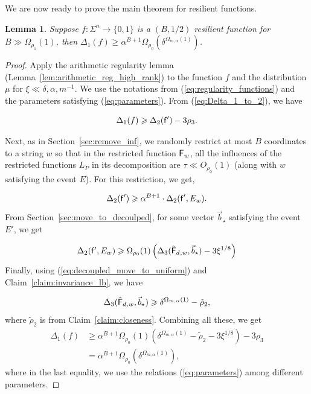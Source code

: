 \documentclass[10pt,a4paper]{amsart}
\newtheorem{lemma}[thm]{Lemma}
\renewcommand\geq{\geqslant}
\newcommand{\V}[1]{{#1}}
\begin{document}
We are now ready to prove the main theorem for resilient functions.
\begin{lemma}\label{lemma:mainthm_resilient_f}
    Suppose $f:\Sigma^n \rightarrow \{0,1\}$ is a $(B, 1/2)$ resilient function for $B \gg \Omega_{\rho_1}(1)$, then $\Delta_1(f)\geq  \alpha^{B+1} \Omega_{\rho_0}(\delta^{\Omega_{m,\alpha}(1)})$.
\end{lemma}
\begin{proof}
    Apply the arithmetic regularity lemma (Lemma~\ref{lem:arithmetic_reg_high_rank}) to the function $f$ and the distribution $\mu$ for $\xi\ll \delta,\alpha, m^{-1}$. We use the notations from (\ref{eq:regularity_functions}) and the parameters satisfying (\ref{eq:parameters}). From (\ref{eq:Delta_1_to_2}), we have
    
    $$\Delta_1(f) \geq \Delta_2(\noisyfrefined)  - 3\rho_3.$$

    Next, as in Section~\ref{sec:remove_inf}, we randomly restrict at most $B$ coordinates to a string $\V w$ so that in the restricted function $\fcoarsedecomposed_{\V w}$, all the influences of the restricted functions $L_P$ in its decomposition are $\tau  \ll O_{\rho_0}(1)$ (along with $\V w$ satisfying the event $E$). For this restriction, we get,
    
    $$\Delta_2(\noisyfrefined) \geq \alpha^{B+1}\cdot \Delta_2(\noisyfrefined, E_{\V w}).$$
   From Section~\ref{sec:move_to_decoulped}, for some vector $\vec{b}_\star$ satisfying the event $E'$, we get

    $$ \Delta_2(\noisyfrefined, E_{\V w}) \geq \Omega_{\rho_0}(1)\left(\Delta_3(\truncfcoarsedecoupled_{, \V w}, \vec{b}_\star) - 3\xi^{1/8}\right)$$
    Finally, using (\ref{eq:decoupled_move_to_uniform}) and Claim~\ref{claim:invariance_lb}, we have

$$\Delta_3(\truncfcoarsedecoupled_{, \V w}, \vec{b}_\star)\geq \delta^{\Omega_{m,\alpha}(1)} -\tilde{\rho}_2,$$
where $\tilde{\rho}_2$ is from Claim~\ref{claim:closeness}. Combining all these, we get
\begin{align*}
\Delta_1(f) &\geq  \alpha^{B+1} \Omega_{\rho_0}(1)\left( \delta^{\Omega_{m,\alpha}(1)} -\tilde{\rho}_2 - 3\xi^{1/8}\right) - 3\rho_3\\
& = \alpha^{B+1} \Omega_{\rho_0}(\delta^{\Omega_{m,\alpha}(1)}),
\end{align*}
where in the last equality, we use the relations (\ref{eq:parameters}) among different parameters. 
\end{proof}
\end{document}
